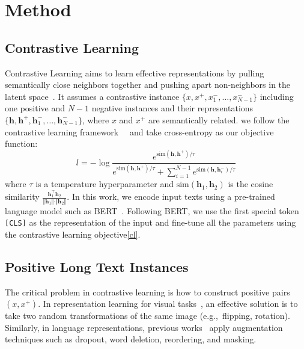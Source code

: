 \documentclass[11pt]{article}
\begin{document}
\section{Method}
\subsection{Contrastive Learning}
Contrastive Learning aims to learn effective representations by pulling semantically close neighbors together and pushing apart non-neighbors in the latent space~\cite{Hadsell2006DimensionalityRB}.
It assumes a contrastive instance $\{x, x^{+}, x_1^{-},\dots,x_{N-1}^{-}\}$ including one positive and $N-1$ negative instances and their representations $\{\mathbf{h}, \mathbf{h}^{+}, \mathbf{h}_1^{-}, \dots,
\mathbf{h}_{N-1}^{-}\}$, where $x$ and $x^{+}$ are semantically related.
we follow the contrastive learning framework~~\cite{Chen2020ASF, Li2022UCTopicUC} and take cross-entropy as our objective function:
\begin{equation}
\label{cl}
    l = -\log \frac{e^{\mathrm{sim}(\mathbf{h}, \mathbf{h}^{+})/\tau}}{e^{\mathrm{sim}(\mathbf{h}, \mathbf{h}^{+})/\tau}+ \sum_{i=1}^{N-1}e^{\mathrm{sim}(\mathbf{h}, \mathbf{h}_i^{-})/\tau}}
\end{equation}
where $\tau$ is a temperature hyperparameter and $\mathrm{sim}(\mathbf{h}_1, \mathbf{h}_2)$ is the cosine similarity $\frac{\mathbf{h}_1^{\top}\mathbf{h}_2}{\Vert \mathbf{h}_1 \Vert \cdot \Vert \mathbf{h}_2 \Vert}$.
In this work, we encode input texts using a pre-trained language model such as BERT~\cite{Devlin2019BERTPO}. Following BERT, we use the first special token \texttt{[CLS]} as the representation of the input and fine-tune all the parameters using the contrastive learning objective\ref{cl}.

\subsection{Positive Long Text Instances}
The critical problem in contrastive learning is how to construct positive pairs $(x, x^{+})$.
In representation learning for visual tasks~\cite{Chen2020ASF}, an effective solution is to take two random transformations of the same image (e.g.,~flipping, rotation).
Similarly, in language representations, previous works~\cite{Gao2021SimCSESC, Karpukhin2020DensePR, Meng2021COCOLMCA, Li2022UCTopicUC} apply augmentation techniques such as dropout, word deletion, reordering, and masking.
\end{document}

